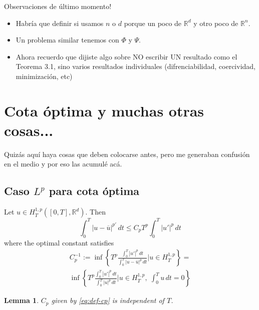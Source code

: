 \documentclass[twoside]{article}
\newtheorem{lem}[thm]{Lemma}
\theoremstyle{remark}
\newcommand{\rr}{\mathbb{R}}
\renewcommand{\leq}{\leqslant}
\begin{document}
\textcolor[rgb]{1,0,0}{Observaciones de \'ultimo momento!
}
\begin{itemize}
\item
Habr\'ia que definir si usamos $n$ o $d$ porque un poco de $\rr^d$ y otro poco de $\rr^n$.
\item Un problema similar tenemos con $\Phi$ y $\Psi$.
\item Ahora recuerdo que dijiste algo sobre NO escribir UN resultado como el Teorema 3.1, sino
varios resultados individuales (difrenciabilidad, coercividad, minimización, etc)
\end{itemize}




\section{Cota \'optima y muchas otras cosas...}

\textcolor[rgb]{1,0,0}{Quiz\'as aqu\'i haya cosas que deben  colocarse antes, pero me generaban confusi\'on en el medio y por eso las acumul\'e ac\'a.
}
\subsection{Caso $L^p$ para cota \'optima }
Let $u \in H^{1,p}_T ([0,T],\rr^d)$. Then
\begin{equation}
\int_0^T |u-\overline{u}|^{p'}\,dt\leq C_p T^p \int_0^T |u'|^p\,dt
\end{equation}
where the optimal constant satisfies
\begin{equation}\label{eq:def-cp}
\begin{split}
C_p^{-1}:=
\inf
\left\{
T^p \frac{\int_0^T |u'|^p\,dt}{\int_0^T |u-\overline{u}|^p\,dt}| u\in H^{1,p}_T
\right\}=
\\
\inf
\left\{
T^p \frac{\int_0^T |u'|^p\,dt}{\int_0^T |u|^p\,dt}| u\in H^{1,p}_T,\;\int_0^T u\,dt=0
\right\}
\end{split}
\end{equation}
 
\begin{lem}
$C_p$ given by \eqref{eq:def-cp} is independent of $T$.
\end{lem}
\end{document}
